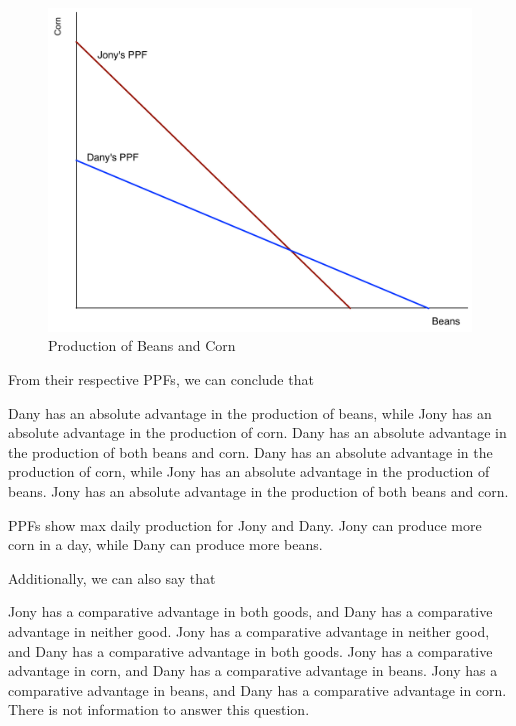 \documentclass[addpoints,11pt]{exam}
\theoremstyle{definition}
\begin{document}
\begin{questions}
		\begin{figure}[H]
			\centering
			\includegraphics[scale=.4]{Final_MC18.pdf}
			\caption{Production of Beans and Corn}
			\label{MC18}
		\end{figure}
		

			
			\question \label{blah3} From their respective PPFs, we can conclude that
			
			\begin{choices}
				\CorrectChoice Dany has an absolute advantage in the production of beans, while Jony has an absolute advantage in the production of corn.
				\choice Dany has an absolute advantage in the production of both beans and corn.
				\choice Dany has an absolute advantage in the production of corn, while Jony has an absolute advantage in the production of beans.
				\choice Jony has an absolute advantage in the production of both beans and corn.
			\end{choices}
			
			\begin{solution}
				PPFs show max daily production for Jony and Dany. Jony can produce more corn in a day, while Dany can produce more beans.
			\end{solution}
			
			\question \label{blah4} Additionally, we can also say that 
			
			\begin{choices}
				\choice Jony has a comparative advantage in both goods, and Dany has a comparative advantage in neither good.
				\choice Jony has a comparative advantage in neither good, and Dany has a comparative advantage in both goods.
				\CorrectChoice Jony has a comparative advantage in corn, and Dany has a comparative advantage in beans.
				\choice Jony has a comparative advantage in beans, and Dany has a comparative advantage in corn.
				\choice There is not information to answer this question.
			\end{choices}
			

\end{questions}
\end{document}
